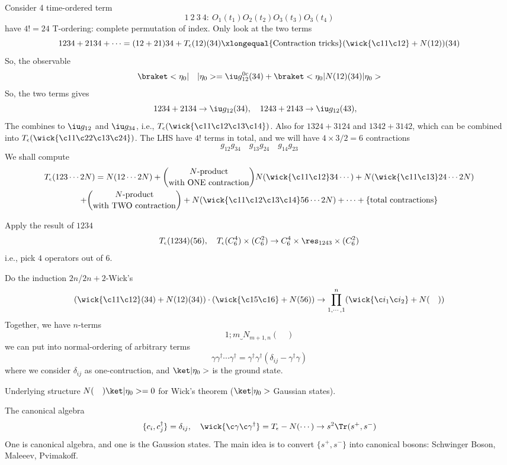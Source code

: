 Consider 4 time-ordered term
\[
  1\ 2\ 3\ 4:\
  O_1(t_1) O_2(t_2) O_3(t_3) O_3(t_4)
\]
have $4! = 24$ T-ordering: complete permutation of index.
Only look at the two terms
\[
  1234 + 2134 + \cdots
= (12 + 21)34 + T_\epsilon (12)(34)
\xlongequal{\text{Contraction tricks}}
  (\wick{\c11\c12} + N(12)) (34)
\]
So, the observable
\[
  \braket<\eta_0|\quad|\eta_0> = \iu g_{12}^{0c}(34)
+ \braket<\eta_0|N(12)(34)|\eta_0>
\]
So, the two terms gives
\[
  1234 + 2134 \to \iu g_{12}(34), \quad
  1243 + 2143 \to \iu g_{12}(43), \quad
\]
The combines to $\iu g_{12}$ and $\iu g_{34}$,
i.e., $T_\epsilon(\wick{\c1 1\c1 2\c1 3\c1 4})$.
Also for $1324 + 3124$ and $1342 + 3142$, which can be combined into
$T_\epsilon(\wick{\c1 1\c2 2\c1 3\c2 4})$.
The LHS have $4!$ terms in total, and we will have $4\times3/2 = 6$ contractions
\[
  g_{12} g_{34} \quad g_{13} g_{24} \quad g_{14} g_{23}
\]
We shall compute
\begin{multline}
  T_\epsilon(123 \cdots 2N)
= N(12\cdots 2N) + \binom{N\text{-product}}{\text{with ONE contraction}}
  N(\wick{\c11\c12}34 \cdots)
+ N(\wick{\c11\c13}24 \cdots 2N) \\
+ \binom{N\text{-product}}{\text{with TWO contraction}}
+ N(\wick{\c11\c12\c13\c14}56 \cdots 2N) + \cdots
+ \{\text{total contractions}\}
\end{multline}
\begin{example}[$T_\epsilon(123456)$]
  Apply the result of $1234$
  \[
    T_\epsilon(1234) (56), \quad
    T_\epsilon(C_6^4) \times (C_6^2)
    \to C_6^4 \times \res_{1243} \times (C_6^2)
  \]
  i.e., pick $4$ operators out of $6$.
\end{example}
Do the induction $2n$/$2n + 2$-Wick's
\[
  (\wick{\c11\c12}(34) + N(12)(34)) \cdot
  (\wick{\c15\c16} + N(56)) \to
  \prod_{1, \cdots, 1}^n (\wick{\c i_1 \c i_2} + N(\quad))
\]
Together, we have $n$-terms
\[
  1; m \underbrace{} N_{m+1, n}(\quad)
\]
we can put into normal-ordering of arbitrary terms
\[
  \gamma\gamma^\dagger \cdots \gamma^\dagger
= \gamma^\dagger \gamma^\dagger(\delta_{ij} - \gamma^\dagger\gamma)
\]
where we consider $\delta_{ij}$ as one-contruction, and $\ket|\eta_0>$ is the
ground state.

Underlying structure $N(\quad) \ket|\eta_0> = 0$ for Wick's theorem
($\ket|\eta_0>$ Gaussian states).

The canonical algebra
\[
  \{c_i, c_j^\dagger\} = \delta_{ij}, \quad
  \wick{\c\gamma \c\gamma^\dagger} = T_\epsilon - N(\cdots)
  \to s^2 \Tr(s^+, s^-)
\]
One is canonical algebra, and one is the Gaussion states.
The main idea is to convert $\{s^+, s^-\}$ into canonical bosons:
Schwinger Boson, Maleeev, Pvimakoff.

